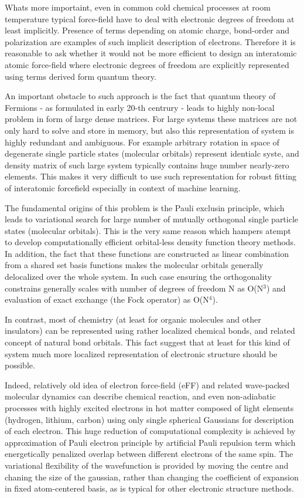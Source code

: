 \documentclass[%
 reprint,
 amsmath,amssymb,
prb,
]{revtex4-1}
\begin{document}
Whats more importaint, even in common cold chemical processes at room temperature typical force-field have to deal with electronic degrees of freedom at least implicitly. Presence of terms depending on atomic charge, bond-order and polarization are examples of such implicit description of electrons. Therefore it is reasonable to ask whether it would not be more efficient to design an interatomic atomic force-field where electronic degrees of freedom are explicitly represented using terms derived form quantum theory. 

An important obstacle to such approach is the fact that quantum theory of Fermions - as formulated in early 20-th centrury - leads to highly non-local problem in form of large dense matrices. For large systems these matrices are not only hard to solve and store in memory, but also this representation of system is highly redundant and ambiguous. For example arbitrary rotation in space of degenerate single particle states (molecular orbitals) represent identialc syste, and density matrix of such large system typically contains huge number nearly-zero elements. This makes it very difficult to use such representation for robust fitting of interatomic forcefield especially in context of machine learning.

The fundamental origins of this problem is the Pauli exclusin principle, which leads to variational search for large number of mutually orthogonal single particle states (molecular orbitals). This is the very same reason which hampers atempt to develop computationally efficient orbital-less density function theory methods. In addition, the fact that these functions are constructed as linear combination from a shared set basis functions makes the molecular orbitals generally delocalized over the whole system. In such case ensuring the orthogonality constrains generally scales with number of degrees of freedom N as O(N$^3$) and evaluation of exact exchange (the Fock operator) as O(N$^4$).

In contrast, most of chemistry (at least for organic molecules and other insulators) can be represented using rather localized chemical bonds, and related concept of natural bond orbitals. This fact suggest that at least for this kind of system much more localized representation of electronic structure should be possible.

Indeed, relatively old idea of electron force-field (eFF) and related wave-packed molecular dynamics can describe chemical reaction, and even non-adiabatic processes with highly excited electrons in hot matter composed of light elements (hydrogen, lithium, carbon) using only single spherical Gaussians for description of each electron. This huge reduction of computational complexity is achieved by approximation of Pauli electron principle by artificial Pauli repulsion term which energetically penalized overlap between different electrons of the same spin. The variational flexibility of the wavefunction is provided by moving the centre and chaning the size of the gaussian, rather than changing the coefficient of expansion in fixed atom-centered basis, as is typical for other electronic structure methods. 
\end{document}
